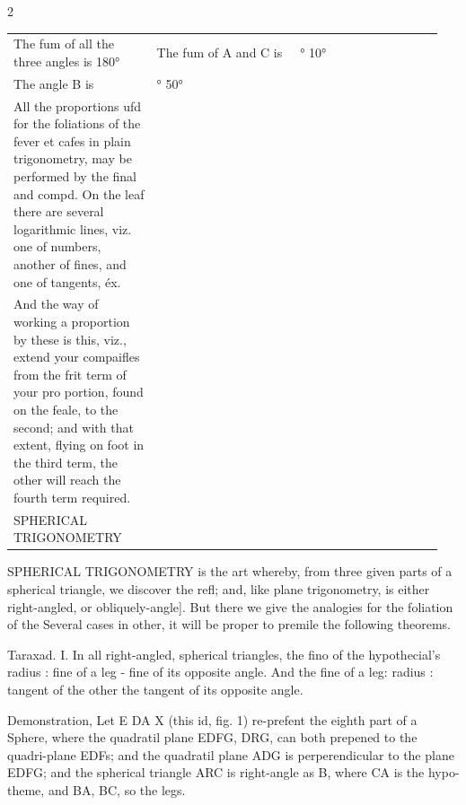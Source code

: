 \documentclass[10pt]{article}
\begin{document}
\begin{multicols}{2}
\begin{center}
\begin{tabular}{>{\raggedright\arraybackslash}p{0.317\linewidth}|>{\raggedright\arraybackslash}p{0.317\linewidth}|>{\raggedright\arraybackslash}p{0.317\linewidth}}
The fum of all the three angles is 180° & The fum of A and C is & 83° 10° \\
The angle B is & 96° 50° &  \\
All the proportions ufd for the foliations of the fever et cafes in plain trigonometry, may be performed by the final and compd. On the leaf there are several logarithmic lines, viz. one of numbers, another of fines, and one of tangents, éx. &  &  \\
And the way of working a proportion by these is this, viz., extend your compaifles from the frit term of your pro portion, found on the feale, to the second; and with that extent, flying on foot in the third term, the other will reach the fourth term required. &  &  \\
SPHERICAL TRIGONOMETRY &  &  \\
\hline
\end{tabular}\end{center}
SPHERICAL TRIGONOMETRY is the art whereby, from three given parts of a spherical triangle, we discover the refl; and, like plane trigonometry, is either right-angled, or obliquely-angle]. But there we give the analogies for the foliation of the Several cases in other, it will be proper to premile the following theorems.

Taraxad. I. In all right-angled, spherical triangles, the fino of the hypothecial’s radius : fine of a leg - fine of its opposite angle. And the fine of a leg: radius : tangent of the other the tangent of its opposite angle.

Demonstration, Let E DA X (this id, fig. 1) re-prefent the eighth part of a Sphere, where the quadratil plane EDFG, DRG, can both prepened to the quadri-plane EDFs; and the quadratil plane ADG is perperendicular to the plane EDFG; and the spherical triangle ARC is right-angle as B, where CA is the hypo-theme, and BA, BC, so the legs.


\end{multicols}
\end{document}
